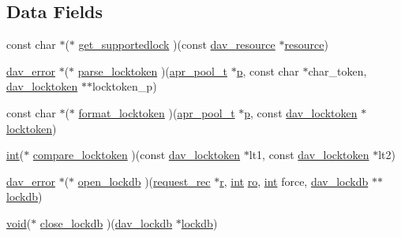 \subsection*{Data Fields}
\begin{DoxyCompactItemize}
\item 
const char $\ast$($\ast$ \hyperlink{structdav__hooks__locks_a639d454c7452c56a2131cefd96ea602f}{get\+\_\+supportedlock} )(const \hyperlink{structdav__resource}{dav\+\_\+resource} $\ast$\hyperlink{group__APR__Util__RL_gaa6244aacafcc4ec1d0727bdb32614b11}{resource})
\item 
\hyperlink{structdav__error}{dav\+\_\+error} $\ast$($\ast$ \hyperlink{structdav__hooks__locks_ae4fdf6c8c501bd174ccc40f5fdd0a0f4}{parse\+\_\+locktoken} )(\hyperlink{structapr__pool__t}{apr\+\_\+pool\+\_\+t} $\ast$\hyperlink{group__APACHE__CORE__MPM_ga5cd91701e5c167f2b1a38e70ab57817e}{p}, const char $\ast$char\+\_\+token, \hyperlink{structdav__locktoken}{dav\+\_\+locktoken} $\ast$$\ast$locktoken\+\_\+p)
\item 
const char $\ast$($\ast$ \hyperlink{structdav__hooks__locks_a2a0a2169e202d658d9afc9e2b8b53238}{format\+\_\+locktoken} )(\hyperlink{structapr__pool__t}{apr\+\_\+pool\+\_\+t} $\ast$\hyperlink{group__APACHE__CORE__MPM_ga5cd91701e5c167f2b1a38e70ab57817e}{p}, const \hyperlink{structdav__locktoken}{dav\+\_\+locktoken} $\ast$\hyperlink{group__MOD__DAV_gaa2478c643fbd5d72dc6c31696dfc6a03}{locktoken})
\item 
\hyperlink{pcre_8txt_a42dfa4ff673c82d8efe7144098fbc198}{int}($\ast$ \hyperlink{structdav__hooks__locks_a16e4aba279e12074d8771a0c1ac0bbb8}{compare\+\_\+locktoken} )(const \hyperlink{structdav__locktoken}{dav\+\_\+locktoken} $\ast$lt1, const \hyperlink{structdav__locktoken}{dav\+\_\+locktoken} $\ast$lt2)
\item 
\hyperlink{structdav__error}{dav\+\_\+error} $\ast$($\ast$ \hyperlink{structdav__hooks__locks_a84b994d542610dace4ae1fe42126d65a}{open\+\_\+lockdb} )(\hyperlink{structrequest__rec}{request\+\_\+rec} $\ast$\hyperlink{pcregrep_8txt_a2e9e9438b26c0bb4425367a7e4f75eb3}{r}, \hyperlink{pcre_8txt_a42dfa4ff673c82d8efe7144098fbc198}{int} \hyperlink{group__MOD__DAV_ga82a842d0e207f481db3ebda5e61c7135}{ro}, \hyperlink{pcre_8txt_a42dfa4ff673c82d8efe7144098fbc198}{int} force, \hyperlink{structdav__lockdb}{dav\+\_\+lockdb} $\ast$$\ast$\hyperlink{group__MOD__DAV_ga4d2e2ae951dbf7731ef129422cb95674}{lockdb})
\item 
\hyperlink{group__MOD__ISAPI_gacd6cdbf73df3d9eed42fa493d9b621a6}{void}($\ast$ \hyperlink{structdav__hooks__locks_a24228d41a138f1eab1252ea3cc6e927d}{close\+\_\+lockdb} )(\hyperlink{structdav__lockdb}{dav\+\_\+lockdb} $\ast$\hyperlink{group__MOD__DAV_ga4d2e2ae951dbf7731ef129422cb95674}{lockdb})

\end{DoxyCompactItemize}
